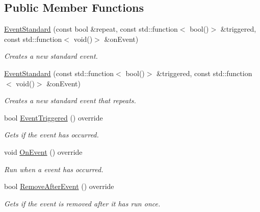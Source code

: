 \subsection*{Public Member Functions}
\begin{DoxyCompactItemize}
\item 
\hyperlink{class_flounder_1_1_event_standard_a1e03e7d6c820244aa01315592fbb56cb}{Event\+Standard} (const bool \&repeat, const std\+::function$<$ bool()$>$ \&triggered, const std\+::function$<$ void()$>$ \&on\+Event)
\begin{DoxyCompactList}\small\item\em Creates a new standard event. \end{DoxyCompactList}\item 
\hyperlink{class_flounder_1_1_event_standard_a5d71c0a68d71d6913539386074998e1f}{Event\+Standard} (const std\+::function$<$ bool()$>$ \&triggered, const std\+::function$<$ void()$>$ \&on\+Event)
\begin{DoxyCompactList}\small\item\em Creates a new standard event that repeats. \end{DoxyCompactList}\item 
bool \hyperlink{class_flounder_1_1_event_standard_a796cd5eb9098a0d2773b32581b9a0899}{Event\+Triggered} () override
\begin{DoxyCompactList}\small\item\em Gets if the event has occurred. \end{DoxyCompactList}\item 
void \hyperlink{class_flounder_1_1_event_standard_a3981a5be6ab41ce624b9752d5f7bdf36}{On\+Event} () override
\begin{DoxyCompactList}\small\item\em Run when a event has occurred. \end{DoxyCompactList}\item 
bool \hyperlink{class_flounder_1_1_event_standard_aa566585df82dfec06f60279112175321}{Remove\+After\+Event} () override
\begin{DoxyCompactList}\small\item\em Gets if the event is removed after it has run once. \end{DoxyCompactList}\end{DoxyCompactItemize}
